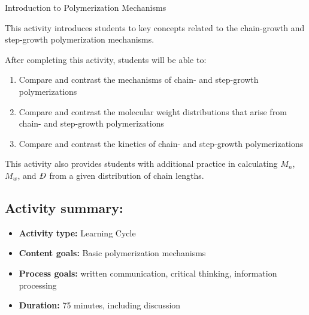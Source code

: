 %
%
%
%

\renewcommand{\figpath}{content/intro/chain-and-step/figs}
\renewcommand{\labelbase}{chain-and-step}

\begin{activity}{Introduction to Polymerization Mechanisms}
\begin{instructornotes}

	This activity introduces students to key concepts related to the chain-growth and step-growth polymerization mechanisms.
	
	After completing this activity, students will be able to:
			\begin{enumerate}
				\item Compare and contrast the mechanisms of chain- and step-growth polymerizations
				\item Compare and contrast the molecular weight distributions that arise from chain- and step-growth polymerizations
				\item Compare and contrast the kinetics of chain- and step-growth polymerizations
			\end{enumerate}
			
	This activity also provides students with additional practice in calculating $M_n$, $M_w$, and $\PDImath$ from a given distribution of chain lengths.
			
	\subsection*{Activity summary:}
	\begin{itemize}
		\item \textbf{Activity type:} Learning Cycle
		\item \textbf{Content goals:} Basic polymerization mechanisms
		\item \textbf{Process goals:} %
			written communication, critical thinking, information processing
		\item \textbf{Duration:} 75 minutes, including discussion 
		

\end{itemize}
\end{instructornotes}
\end{activity}
